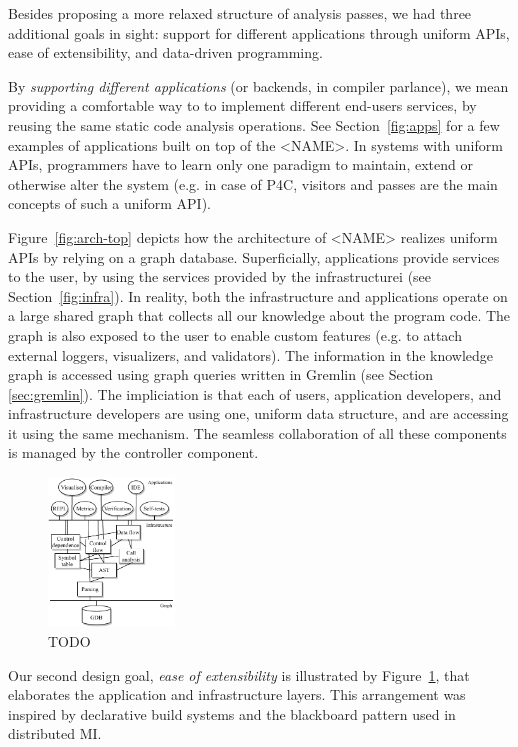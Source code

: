 \documentclass[sigconf]{acmart}
\begin{document}
Besides proposing a more relaxed structure of analysis passes, we had three additional goals in sight: support for different applications through uniform APIs, ease of extensibility, and data-driven programming.

By \textit{supporting different applications} (or backends, in compiler parlance), we mean providing a comfortable way to to implement different end-users services, by reusing the same static code analysis operations.
See Section~\ref{fig:apps} for a few examples of applications built on top of the <NAME>.
In systems with uniform APIs, programmers have to learn only one paradigm to maintain, extend or otherwise alter the system (e.g. in case of P4C, visitors and passes are the main concepts of such a uniform API). 

Figure~\ref{fig:arch-top} depicts how the architecture of <NAME> realizes uniform APIs by relying on a graph database. 
Superficially, applications provide services to the user, by using the services provided by the infrastructurei (see Section~\ref{fig:infra}). In reality, both the infrastructure and applications operate on a large shared graph that collects all our knowledge about the program code. The graph is also exposed to the user to enable custom features (e.g. to attach external loggers, visualizers, and validators). The information in the knowledge graph is accessed using graph queries written in Gremlin (see Section \ref{sec:gremlin}). The impliciation is that each of users, application developers, and infrastructure developers are using one, uniform data structure, and are accessing it using the same mechanism. The seamless collaboration of all these components is managed by the controller component.

  \begin{figure}
    \includegraphics[width=0.3\textwidth]{figures/arch-deps.pdf}
    \caption{TODO}\label{fig:arch-deps}
  \end{figure}

Our second design goal, \textit{ease of extensibility} is illustrated by Figure~\ref{fig:arch-deps}, that elaborates the application and infrastructure layers. 
This arrangement was inspired by declarative build systems and the blackboard pattern used in distributed MI.
\end{document}
